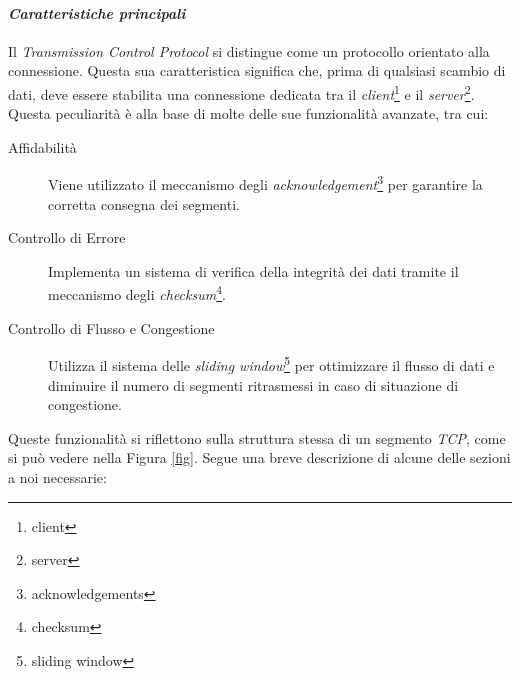 \paragraph{\textit{Caratteristiche principali}}
\noindent Il \emph{Transmission Control Protocol} si distingue come un protocollo orientato alla connessione. Questa sua caratteristica significa che, prima di qualsiasi scambio di dati, deve essere stabilita una connessione dedicata tra il \emph{client}\footnote{\gls{client}} e il \emph{server}\footnote{\gls{server}}.
Questa peculiarità è alla base di molte delle sue funzionalità avanzate, tra cui:
\begin{description}
    \item[Affidabilità] Viene utilizzato il meccanismo degli \emph{acknowledgement}\footnote{\gls{acknowledgements}} per garantire la corretta consegna dei segmenti.

    \item[Controllo di Errore] Implementa un sistema di verifica della integrità dei dati tramite il meccanismo degli \emph{checksum}\footnote{\gls{checksum}}.
    
    \item[Controllo di Flusso e Congestione] Utilizza il sistema delle \emph{sliding window}\footnote{\gls{sliding window}} per ottimizzare il flusso di dati e diminuire il numero di segmenti ritrasmessi in caso di situazione di congestione.
\end{description}

\noindent Queste funzionalità si riflettono sulla struttura stessa di un segmento \emph{TCP}, come si può vedere nella Figura \ref{fig}. Segue una breve descrizione di alcune delle sezioni a noi necessarie:

